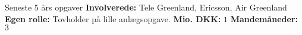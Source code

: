 \begin{rubric}{Seneste 5 års opgaver}
\entry* \textbf{Involverede:} Tele Greenland, Ericsson, Air Greenland
\entry* \textbf{Egen rolle:} Tovholder på lille anlægsopgave.
\entry* \textbf{Mio. DKK:} $1$
\entry* \textbf{Mandemåneder:} $3$
%

\end{rubric}
